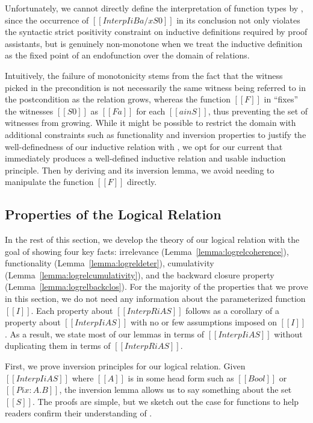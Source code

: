 \documentclass[\ifpublic nolinenum\else\fi,online,OA]{jfp}
\newcommand{\jc}[1]{}
\theoremstyle{definition}
\begin{document}
Unfortunately, we cannot directly define the interpretation of function types
by , since the occurrence of $[[Interp I i B {a/x} S0]]$ in its
conclusion not only violates the syntactic strict positivity constraint on
inductive definitions required by proof assistants,
but is genuinely non-monotone when we treat the inductive definition
as the fixed point of an endofunction over the domain of relations.
\jc{What?}
Intuitively, the failure of monotonicity stems from the fact that the witness
picked in the precondition is not necessarily the same witness being referred
to in the postcondition as the relation grows, \jc{Why?} whereas the function $[[F]]$
in  ``fixes'' the witnesses $[[S0]]$ as $[[F a]]$ for each
$[[a in S]]$, thus preventing the set of witnesses from growing. While it might
be possible to restrict the domain with additional constraints such as
functionality and inversion properties to justify the well-definedness of our
inductive relation with , we opt for our current
 that immediately produces a
well-defined inductive relation and usable induction principle.
Then by deriving  and its inversion lemma,
we avoid needing to manipulate the function $[[F]]$ directly.

\subsection{Properties of the Logical Relation}
In the rest of this section, we develop the theory of our logical relation
with the goal of showing four key facts: irrelevance
(Lemma~\ref{lemma:logrelcoherence}), functionality
(Lemma~\ref{lemma:logreldeter}), cumulativity
(Lemma~\ref{lemma:logrelcumulativity}), and the backward closure property
(Lemma~\ref{lemma:logrelbackclos}).  For the majority of the properties that
we prove in this section, we do not need any information about the
parameterized function $[[I]]$.  Each property about $[[InterpR i A S]]$
follows as a corollary of a property about $[[Interp I i A S]]$ with no or few
assumptions imposed on $[[I]]$. As a result, we state most of our lemmas in
terms of $[[Interp I i A S]]$ without duplicating them in terms of
$[[InterpR i A S]]$.

First, we prove inversion principles for our logical relation. Given
$[[Interp I i A S]]$ where $[[A]]$ is in some head form such as $[[Bool]]$ or
$[[Pi x : A . B]]$, the inversion lemma allows us to say something about the set
$[[S]]$. The proofs are simple, but we sketch out the case for
functions to help readers confirm their understanding of .
\end{document}
